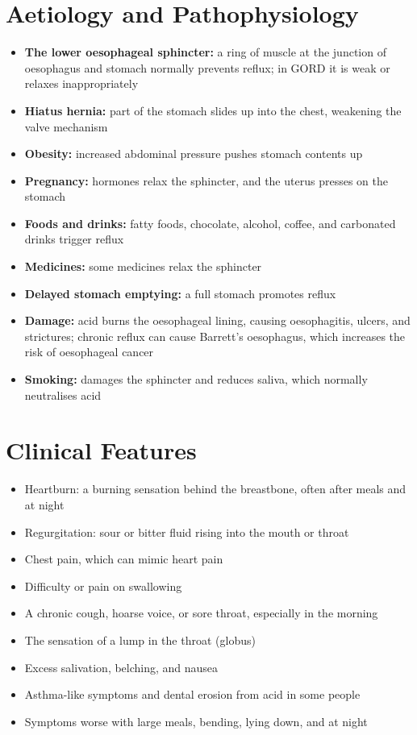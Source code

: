 \section*{Aetiology and Pathophysiology}
\begin{itemize}
    \item \textbf{The lower oesophageal sphincter:} a ring of muscle at the junction of oesophagus and stomach normally prevents reflux; in GORD it is weak or relaxes inappropriately
    \item \textbf{Hiatus hernia:} part of the stomach slides up into the chest, weakening the valve mechanism
    \item \textbf{Obesity:} increased abdominal pressure pushes stomach contents up
    \item \textbf{Pregnancy:} hormones relax the sphincter, and the uterus presses on the stomach
    \item \textbf{Foods and drinks:} fatty foods, chocolate, alcohol, coffee, and carbonated drinks trigger reflux
    \item \textbf{Medicines:} some medicines relax the sphincter
    \item \textbf{Delayed stomach emptying:} a full stomach promotes reflux
    \item \textbf{Damage:} acid burns the oesophageal lining, causing oesophagitis, ulcers, and strictures; chronic reflux can cause Barrett's oesophagus, which increases the risk of oesophageal cancer
    \item \textbf{Smoking:} damages the sphincter and reduces saliva, which normally neutralises acid
\end{itemize}

\section*{Clinical Features}
\begin{itemize}
    \item Heartburn: a burning sensation behind the breastbone, often after meals and at night
    \item Regurgitation: sour or bitter fluid rising into the mouth or throat
    \item Chest pain, which can mimic heart pain
    \item Difficulty or pain on swallowing
    \item A chronic cough, hoarse voice, or sore throat, especially in the morning
    \item The sensation of a lump in the throat (globus)
    \item Excess salivation, belching, and nausea
    \item Asthma-like symptoms and dental erosion from acid in some people
    \item Symptoms worse with large meals, bending, lying down, and at night
\end{itemize}

